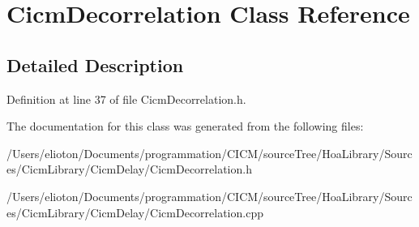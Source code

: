 \hypertarget{class_cicm_decorrelation}{\section{Cicm\-Decorrelation Class Reference}
\label{class_cicm_decorrelation}
}


\subsection{Detailed Description}


Definition at line 37 of file Cicm\-Decorrelation.\-h.



The documentation for this class was generated from the following files\-:\begin{DoxyCompactItemize}
\item 
/\-Users/elioton/\-Documents/programmation/\-C\-I\-C\-M/source\-Tree/\-Hoa\-Library/\-Sources/\-Cicm\-Library/\-Cicm\-Delay/Cicm\-Decorrelation.\-h\item 
/\-Users/elioton/\-Documents/programmation/\-C\-I\-C\-M/source\-Tree/\-Hoa\-Library/\-Sources/\-Cicm\-Library/\-Cicm\-Delay/Cicm\-Decorrelation.\-cpp\end{DoxyCompactItemize}
